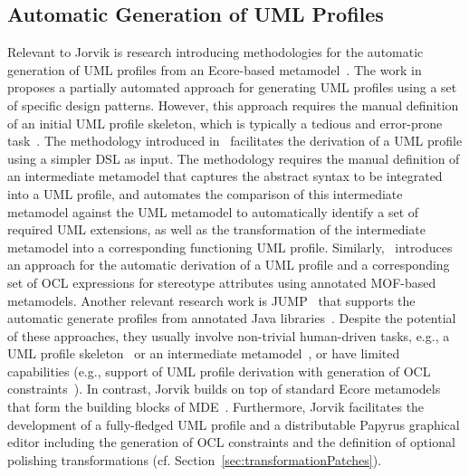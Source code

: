 \subsection{Automatic Generation of UML Profiles}
Relevant to Jorvik is research introducing methodologies for the automatic 
generation of UML profiles from an Ecore-based metamodel~\cite{Kraas17}. 
The work in~\cite{Lagarde2008:FASE} proposes a partially automated approach for 
generating UML profiles using a set of specific design patterns. However, this 
approach requires the manual definition of an initial UML profile skeleton, 
which is typically a tedious and error-prone task~\cite{Wimmer2009:IJWIS}. 
The methodology introduced in~\cite{Giachetti2008:ER,Giachetti2009:CAISE} 
facilitates the derivation of a UML profile using a simpler DSL as input.
The methodology requires the manual definition of an intermediate metamodel 
that captures the abstract syntax to be integrated into a UML profile, and 
automates the comparison of this intermediate metamodel against the UML 
metamodel to automatically identify a set of required UML extensions, as well 
as the transformation of the intermediate metamodel into a corresponding 
functioning UML profile. 
Similarly,~\cite{Kraas17} introduces an approach for the automatic derivation of a UML profile and a corresponding set of OCL expressions
for stereotype attributes using annotated MOF-based metamodels.
Another relevant research work is JUMP~\cite{Bergmayr2014:MODELS} that supports the automatic generate profiles from annotated Java libraries~\cite{Bergmayr2014:MODELS}.
Despite the potential of these approaches, they usually involve
non-trivial human-driven tasks, e.g., a UML profile 
skeleton~\cite{Lagarde2008:FASE} or an intermediate 
metamodel~\cite{Giachetti2008:ER,Giachetti2009:CAISE}, or have limited capabilities (e.g., support of UML profile derivation with generation of OCL constraints~\cite{Kraas17}). In contrast, Jorvik builds on top of standard Ecore metamodels that form the building blocks of MDE~\cite{omg2014meta}. 
Furthermore, Jorvik facilitates the development of a fully-fledged UML profile and a distributable Papyrus graphical editor including the generation of OCL constraints and the definition of optional polishing transformations (cf. 
Section~\ref{sec:transformationPatches}).



